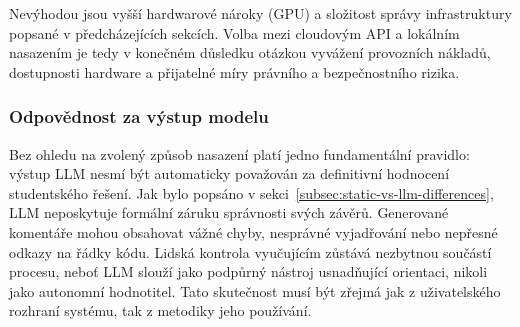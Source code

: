Nevýhodou jsou vyšší hardwarové nároky (GPU) a složitost správy infrastruktury popsané v předcházejících sekcích.
Volba mezi cloudovým API a lokálním nasazením je tedy v konečném důsledku otázkou vyvážení provozních nákladů, dostupnosti hardware a přijatelné míry právního a bezpečnostního rizika.

\subsubsection*{Odpovědnost za výstup modelu}
\label{subsubsec:llm-output-responsibility}

Bez ohledu na zvolený způsob nasazení platí jedno fundamentální pravidlo: výstup LLM nesmí být automaticky považován za definitivní hodnocení studentského řešení.
Jak bylo popsáno v sekci~\ref{subsec:static-vs-llm-differences}, LLM neposkytuje formální záruku správnosti svých závěrů.
Generované komentáře mohou obsahovat vážné chyby, nesprávné vyjadřování nebo nepřesné odkazy na řádky kódu.
Lidská kontrola vyučujícím zůstává nezbytnou součástí procesu, neboť LLM slouží jako podpůrný nástroj usnadňující orientaci, nikoli jako autonomní hodnotitel.
Tato skutečnost musí být zřejmá jak z uživatelského rozhraní systému, tak z metodiky jeho používání.

\endinput

